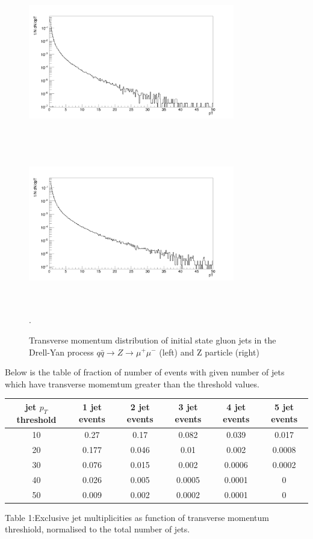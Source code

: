\documentclass{article}		%
\begin{document}
\begin{figure}[h]
	\begin{center}
		\includegraphics[width=90mm,height=70mm]{jetpt.png} \includegraphics[width=90mm,height=70mm]{zetpt.png} 
		\caption{Transverse momentum distribution of initial state gluon jets in the Drell-Yan process $q\bar{q} \to Z \to \mu^+\mu^-$ (left) and Z particle (right)}.  					
	\end{center}
	\centering	
\end{figure}


\newpage

Below is the table of fraction of number of events with given number of jets which have transverse momemtum greater than the threshold values. 

\begin{center}
	\begin{tabular}{|c|c|c|c|c|c|}
		\hline
	jet $p_T$ threshold & 1 jet events& 2 jet events& 3 jet events & 4 jet events & 5 jet events \\
		\hline
	10 & 0.27 & 0.17 & 0.082 & 0.039& 0.017\\
	\hline
	20 & 0.177 & 0.046 & 0.01 & 0.002 & 0.0008\\
	\hline
	30 & 0.076 & 0.015 & 0.002 & 0.0006 & 0.0002\\
	\hline
	40 & 0.026 & 0.005 & 0.0005 & 0.0001 & 0\\
	\hline				
	50 & 0.009 & 0.002 & 0.0002 & 0.0001 & 0\\
	\hline
	\end{tabular}
\end{center}
	\begin{center}
			Table 1:Exclusive jet multiplicities as function of transverse momentum threshiold, normalised to the total number of jets.
	\end{center}
\end{document}
